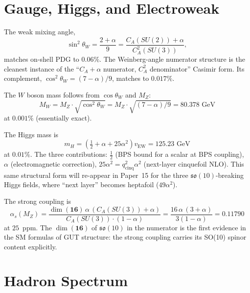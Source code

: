\documentclass[11pt]{article}
\newcommand{\so}{\mathfrak{so}}
\newcommand{\half}{\tfrac{1}{2}}
\newcommand{\CA}{C_A}
\begin{document}
\section{Gauge, Higgs, and Electroweak}
\label{sec:gauge}

The weak mixing angle,
\begin{equation}
  \sin^2\theta_W = \frac{2+\alpha}{9}
    = \frac{\CA(SU(2)) + \alpha}{\CA^2(SU(3))},
\end{equation}
matches on-shell PDG to $0.06\%$.  The Weinberg-angle numerator
structure is the cleanest instance of the ``$\CA + \alpha$
numerator, $\CA^2$ denominator'' Casimir form.  Its complement,
$\cos^2\theta_W = (7-\alpha)/9$, matches to $0.017\%$.

The $W$ boson mass follows from $\cos\theta_W$ and $M_Z$:
\begin{equation}
  M_W = M_Z \cdot \sqrt{\cos^2\theta_W}
      = M_Z \cdot \sqrt{(7-\alpha)/9} = 80.378\text{ GeV}
\end{equation}
at $0.001\%$ (essentially exact).

The Higgs mass is
\begin{equation}
  m_H = \left(\tfrac{1}{2} + \alpha + 25\alpha^2\right) v_\text{EW}
      = 125.23\text{ GeV}
\end{equation}
at $0.01\%$.  The three contributions: $\half$ (BPS bound for a
scalar at BPS coupling), $\alpha$ (electromagnetic correction),
$25\alpha^2 = q^2_\text{cinq}\alpha^2$ (next-layer cinquefoil NLO).
This same structural form will re-appear in Paper~15 for the
three $\so(10)$-breaking Higgs fields, where ``next layer'' becomes
heptafoil ($49\alpha^2$).

The strong coupling is
\begin{equation}
  \alpha_s(M_Z) = \frac{\dim(\mathbf{16})\,\alpha\,(\CA(SU(3)) + \alpha)}
                        {\CA(SU(3)) \cdot (1-\alpha)}
                = \frac{16\,\alpha\,(3+\alpha)}{3(1-\alpha)}
                = 0.11790
\end{equation}
at $25$~ppm.  The $\dim(\mathbf{16})$ of $\so(10)$ in the
numerator is the first evidence in the SM formulas of GUT
structure: the strong coupling carries its SO(10) spinor
content explicitly.

\section{Hadron Spectrum}
\label{sec:hadrons}
\end{document}
